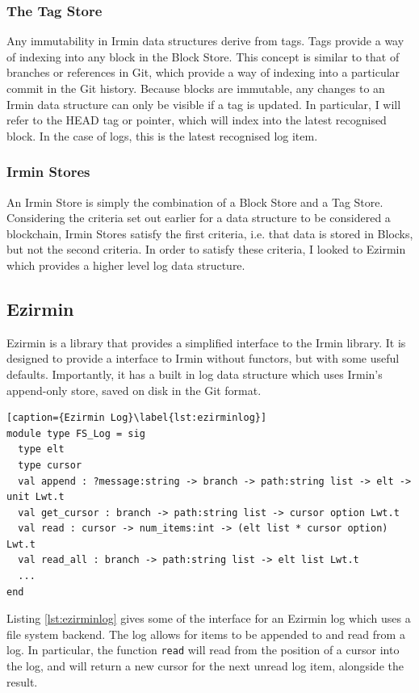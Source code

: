 \documentclass[12pt,a4paper,twoside,openright]{report}
\begin{document}
		\subsubsection*{The Tag Store}
		Any immutability in Irmin data structures derive from tags.
		Tags provide a way of indexing into any block in the Block Store.
		This concept is similar to that of branches or references in Git, which provide a way of indexing into a particular commit in the Git history.
		Because blocks are immutable, any changes to an Irmin data structure can only be visible if a tag is updated. 
		In particular, I will refer to the HEAD tag or pointer, which will index into the latest recognised block.
		In the case of logs, this is the latest recognised log item.
		\subsubsection*{Irmin Stores}
		An Irmin Store is simply the combination of a Block Store and a Tag Store.
		Considering the criteria set out earlier for a data structure to be considered a blockchain, Irmin Stores satisfy the first criteria, i.e. that data is stored in Blocks, but not the second criteria.
		In order to satisfy these criteria, I looked to Ezirmin which provides a higher level log data structure.

	\subsection{Ezirmin}
	Ezirmin is a library that provides a simplified interface to the Irmin library. It is designed to provide a interface to Irmin without functors, but with some useful defaults. Importantly, it has a built in log data structure which uses Irmin's append-only store, saved on disk in the Git format.\\
	\begin{lstlisting}[caption={Ezirmin Log}\label{lst:ezirminlog}]
module type FS_Log = sig
  type elt 
  type cursor 
  val append : ?message:string -> branch -> path:string list -> elt -> unit Lwt.t
  val get_cursor : branch -> path:string list -> cursor option Lwt.t
  val read : cursor -> num_items:int -> (elt list * cursor option) Lwt.t
  val read_all : branch -> path:string list -> elt list Lwt.t
  ...
end
	\end{lstlisting}
	Listing \ref{lst:ezirminlog} gives some of the interface for an Ezirmin log which uses a file system backend.
	The log allows for items to be appended to and read from a log.
	In particular, the function \texttt{read} will read from the position of a cursor into the log, and will return a new cursor for the next unread log item, alongside the result.
\end{document}
